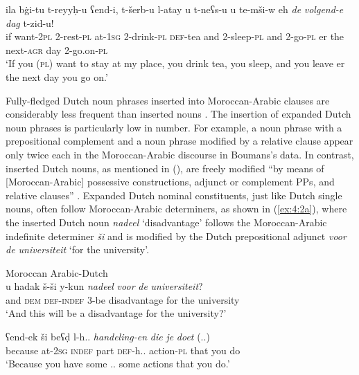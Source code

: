 \ex{\label{ex:4:1c}}
\gll ila bġi-tu t-reyyḥ-u ʕend-i, t-šerb-u l-atay u t-neʕs-u u te-mši-w eh \textit{de} \textit{volgend-e} \textit{dag} t-zid-u!\\
	if want-\textsc{2pl} 2-rest-\textsc{pl} at-\textsc{1sg} 2-drink-\textsc{pl} \textsc{def}-tea and 2-sleep-\textsc{pl} and 2-go-\textsc{pl} er the next-\textsc{agr} day 2-go.on-\textsc{pl}\\
\glt `If you (\textsc{pl}) want to stay at my place, you drink tea, you sleep, and you leave er the next day you go on.'
\z
\z

\noindent Fully-fledged Dutch noun phrases inserted into Moroccan-Arabic clauses are considerably less frequent than inserted nouns \citep[cf.][210]{boumans-syntax-1998}. The insertion of expanded Dutch noun phrases is particularly low in number. For example, a noun phrase with a prepositional complement and a noun phrase modified by a relative clause appear only twice each in the Moroccan-Arabic discourse in Boumans's data. In contrast, inserted Dutch nouns, as mentioned in (), are freely modified ``by means of [Moroccan-Arabic] possessive constructions, adjunct or complement PPs, and relative clauses'' \citep[201]{boumans-syntax-1998}. Expanded Dutch nominal constituents, just like Dutch single nouns, often follow  Moroccan-Arabic determiners, as shown in  (\ref{ex:4:2a}), where the inserted Dutch noun \textit{nadeel} `disadvantage' follows the Moroccan-Arabic indefinite determiner \textit{ši} and is modified by the Dutch prepositional adjunct \textit{voor de universiteit} `for the university'.

\ea
Moroccan Arabic-Dutch \citep[198, 192]{boumans-syntax-1998}\\

\ea{\label{ex:4:2a}}
\gll u hadak š-ši y-kun \textit{nadeel} \textit{voor} \textit{de} \textit{universiteit}?\\
	and \textsc{dem} \textsc{def-indef}  3-be disadvantage for the university\\
\glt `And this will be a disadvantage for the university?'

\ex{\label{ex:4:2b}}
 ʕend-ek ši  beʕḍ l-h.. \textit{handeling-en} \textit{die} \textit{je} {\textit{doet} (..)}\\
	because at-\textsc{2sg} \textsc{indef} part \textsc{def}-h.. action-\textsc{pl} that you do\\
\glt `Because you have some .. some actions that you do.'
\z
\z

